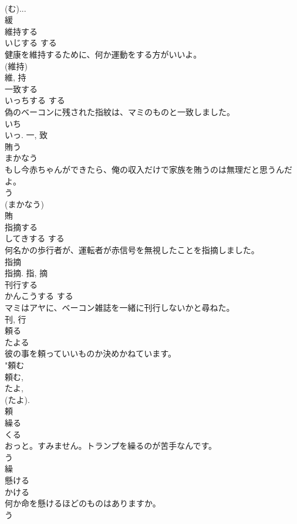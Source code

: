 \documentclass[8pt]{extreport}
\begin{document}
\begin{CJK}{UTF8}{min}
\\	(む)...	
\\	緩	
\\	維持する	
\\	いじする	する 
\\	健康を維持するために、何か運動をする方がいいよ。	
\\	(維持)
\\	維, 持	
\\	一致する	
\\	いっちする	する 
\\	偽のベーコンに残された指紋は、マミのものと一致しました。	
\\	いち 
\\	いっ.	一, 致	
\\	賄う	
\\	まかなう	
\\	もし今赤ちゃんができたら、俺の収入だけで家族を賄うのは無理だと思うんだよ。	
\\	う 
\\	(まかなう) 
\\	賄	
\\	指摘する	
\\	してきする	する 
\\	何名かの歩行者が、運転者が赤信号を無視したことを指摘しました。	
\\	指摘 
\\	指摘.	指, 摘	
\\	刊行する	
\\	かんこうする	する 
\\	マミはアヤに、ベーコン雑誌を一緒に刊行しないかと尋ねた。	
\\	刊, 行	
\\	頼る	
\\	たよる	
\\	彼の事を頼っていいものか決めかねています。	
\\	"頼む 
\\	頼む, 
\\	たよ, 
\\	(たよ). 
\\	頼	
\\	繰る	
\\	くる	
\\	おっと。すみません。トランプを繰るのが苦手なんです。	
\\	う 
\\	繰	
\\	懸ける	
\\	かける	
\\	何か命を懸けるほどのものはありますか。	
\\	う 

\end{CJK}
\end{document}

